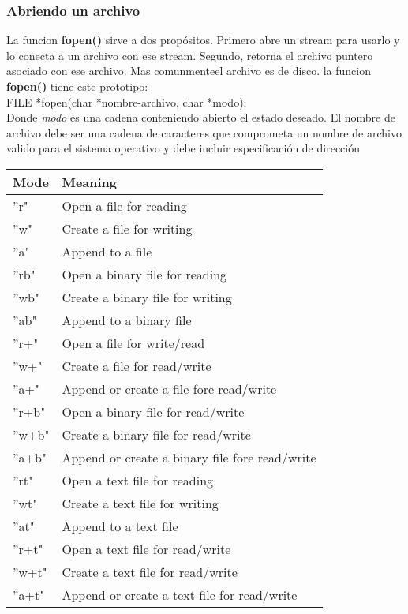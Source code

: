 \documentclass[]{article}
\begin{document}
	\subsubsection{Abriendo un archivo}
	
	La funcion \textbf{fopen()} sirve a dos propósitos. Primero abre un stream para usarlo y lo conecta a un archivo con ese stream. Segundo, retorna el archivo puntero asociado con ese archivo. Mas comunmenteel archivo es de disco. la funcion \textbf{fopen()} tiene este prototipo:\\
	
	FILE *fopen(char *nombre-archivo, char *modo);\\
	
	Donde \textit{modo} es una cadena conteniendo abierto el estado deseado. El nombre de archivo debe ser una cadena de caracteres que comprometa un nombre de archivo valido para el sistema operativo y debe incluir especificación de dirección
	
	\begin{tabular}{l|l}
		\textbf{Mode} & \textbf{Meaning}\\[.7ex]
		\hline
		''r" & Open a file for reading\\[.7ex]
		''w" & Create a file for writing\\[.7ex]
		''a" & Append to a file\\[.7ex]
		''rb" & Open a binary file for reading\\[.7ex]
		''wb" & Create a binary file for writing\\[.7ex]
		''ab" & Append to a binary file\\[.7ex]
		''r+" & Open a file for write/read\\[.7ex]
		''w+" & Create a file for read/write\\[.7ex]
		''a+" & Append or create a file fore read/write\\[.7ex]
		''r+b" & Open a binary file for read/write\\[.7ex]
		''w+b" & Create a binary file for read/write\\[.7ex]
		''a+b" & Append or create a binary file fore read/write\\[.7ex]
		''rt" & Open a text file for reading\\[.7ex]
		''wt" & Create a text file for writing\\[.7ex]
		''at" & Append to a text file\\[.7ex]
		''r+t" & Open a text file for read/write\\[.7ex]
		''w+t" & Create a text file for read/write\\[.7ex]
		''a+t" & Append or create a text file for read/write
	\end{tabular}
	
\end{document}
